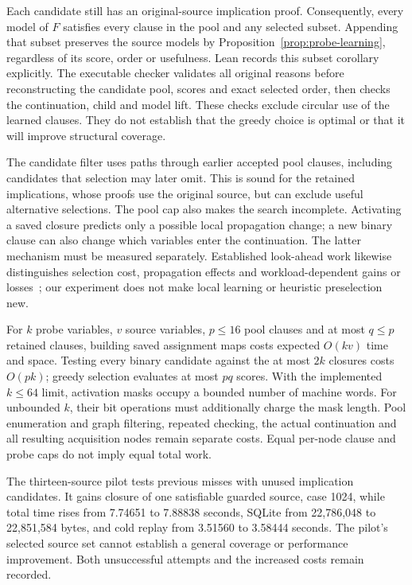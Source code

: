 \documentclass[11pt,a4paper]{article}
\numberwithin{equation}{section}
\theoremstyle{plain}
\theoremstyle{definition}
\theoremstyle{remark}
\begin{document}
Each candidate still has an original-source implication proof. Consequently, every model of $F$ satisfies every clause in the pool and any selected subset. Appending that subset preserves the source models by Proposition~\ref{prop:probe-learning}, regardless of its score, order or usefulness. Lean records this subset corollary explicitly. The executable checker validates all original reasons before reconstructing the candidate pool, scores and exact selected order, then checks the continuation, child and model lift. These checks exclude circular use of the learned clauses. They do not establish that the greedy choice is optimal or that it will improve structural coverage.

The candidate filter uses paths through earlier accepted pool clauses, including candidates that selection may later omit. This is sound for the retained implications, whose proofs use the original source, but can exclude useful alternative selections. The pool cap also makes the search incomplete. Activating a saved closure predicts only a possible local propagation change; a new binary clause can also change which variables enter the continuation. The latter mechanism must be measured separately. Established look-ahead work likewise distinguishes selection cost, propagation effects and workload-dependent gains or losses~\citep[Section~7]{heule2005marcheq}; our experiment does not make local learning or heuristic preselection new.

For $k$ probe variables, $v$ source variables, $p\leq16$ pool clauses and at most $q\leq p$ retained clauses, building saved assignment maps costs expected $O(kv)$ time and space. Testing every binary candidate against the at most $2k$ closures costs $O(pk)$; greedy selection evaluates at most $pq$ scores. With the implemented $k\leq64$ limit, activation masks occupy a bounded number of machine words. For unbounded $k$, their bit operations must additionally charge the mask length. Pool enumeration and graph filtering, repeated checking, the actual continuation and all resulting acquisition nodes remain separate costs. Equal per-node clause and probe caps do not imply equal total work.

The thirteen-source pilot tests previous misses with unused implication candidates. It gains closure of one satisfiable guarded source, case 1024, while total time rises from 7.74651 to 7.88838 seconds, SQLite from 22,786,048 to 22,851,584 bytes, and cold replay from 3.51560 to 3.58444 seconds. The pilot's selected source set cannot establish a general coverage or performance improvement. Both unsuccessful attempts and the increased costs remain recorded.
\end{document}

